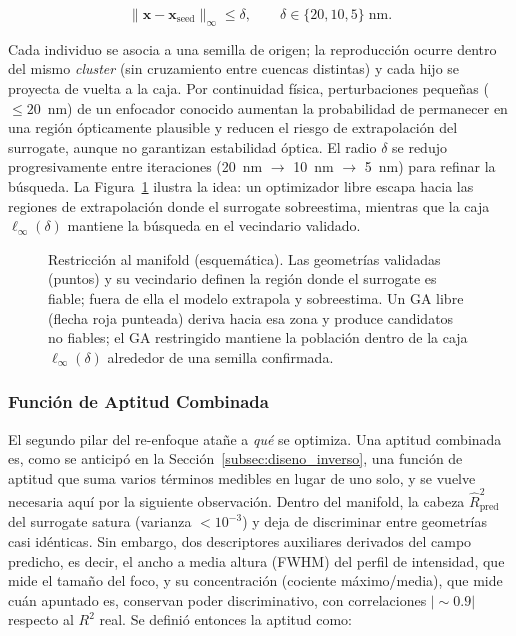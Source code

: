 \begin{equation}
    \|\mathbf{x} - \mathbf{x}_{\text{seed}}\|_{\infty} \leq \delta, \qquad
    \delta \in \{20, 10, 5\}\;\text{nm}.
    \label{eq:manifold_box}
\end{equation}

Cada individuo se asocia a una semilla de origen; la reproducción ocurre dentro del mismo \textit{cluster} (sin cruzamiento entre cuencas distintas) y cada hijo se proyecta de vuelta a la caja. Por continuidad física, perturbaciones pequeñas ($\leq 20$~nm) de un enfocador conocido aumentan la probabilidad de permanecer en una región ópticamente plausible y reducen el riesgo de extrapolación del surrogate, aunque no garantizan estabilidad óptica. El radio $\delta$ se redujo progresivamente entre iteraciones (20~nm $\rightarrow$ 10~nm $\rightarrow$ 5~nm) para refinar la búsqueda. La Figura~\ref{fig:manifold_esquema} ilustra la idea: un optimizador libre escapa hacia las regiones de extrapolación donde el surrogate sobreestima, mientras que la caja $\ell_\infty(\delta)$ mantiene la búsqueda en el vecindario validado.

\begin{figure}[H]
    \centering
    \resizebox{0.85\textwidth}{!}{}
    \caption{Restricción al manifold (esquemática). Las geometrías validadas (puntos) y su
    vecindario definen la región donde el surrogate es fiable; fuera de ella el modelo
    extrapola y sobreestima. Un GA libre (flecha roja punteada) deriva hacia esa zona y
    produce candidatos no fiables; el GA restringido mantiene la población dentro de la caja
    $\ell_\infty(\delta)$ alrededor de una semilla confirmada.}
    \label{fig:manifold_esquema}
\end{figure}

\subsubsection{Función de Aptitud Combinada}\label{subsubsec:combo}

El segundo pilar del re-enfoque atañe a \emph{qué} se optimiza. Una aptitud combinada es, como se anticipó en la Sección~\ref{subsec:diseno_inverso}, una función de aptitud que suma varios términos medibles en lugar de uno solo, y se vuelve necesaria aquí por la siguiente observación. Dentro del manifold, la cabeza $\hat{R}^2_{\text{pred}}$ del surrogate satura (varianza $<10^{-3}$) y deja de discriminar entre geometrías casi idénticas. Sin embargo, dos descriptores auxiliares derivados del campo predicho, es decir, el ancho a media altura (FWHM) del perfil de intensidad, que mide el tamaño del foco, y su concentración (cociente máximo/media), que mide cuán apuntado es, conservan poder discriminativo, con correlaciones $|{\sim}0.9|$ respecto al $R^2$ real. Se definió entonces la aptitud como:

